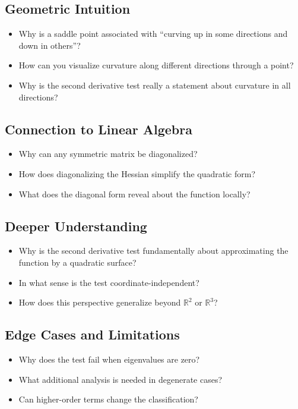 \subsection{Geometric Intuition}

\begin{itemize}
  \item Why is a saddle point associated with ``curving up in some directions and down in others''?
  \item How can you visualize curvature along different directions through a point?
  \item Why is the second derivative test really a statement about curvature in all directions?
\end{itemize}

\subsection{Connection to Linear Algebra}

\begin{itemize}
  \item Why can any symmetric matrix be diagonalized?
  \item How does diagonalizing the Hessian simplify the quadratic form?
  \item What does the diagonal form reveal about the function locally?
\end{itemize}

\subsection{Deeper Understanding}

\begin{itemize}
  \item Why is the second derivative test fundamentally about approximating the function by a quadratic surface?
  \item In what sense is the test coordinate-independent?
  \item How does this perspective generalize beyond $\mathbb{R}^2$ or $\mathbb{R}^3$?
\end{itemize}

\subsection{Edge Cases and Limitations}

\begin{itemize}
  \item Why does the test fail when eigenvalues are zero?
  \item What additional analysis is needed in degenerate cases?
  \item Can higher-order terms change the classification?
\end{itemize}
